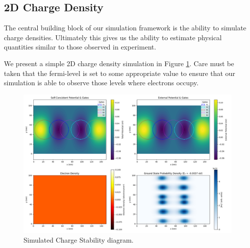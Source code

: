 \documentclass{article}
\begin{document}
\subsection{2D Charge Density}
The central building block of our simulation framework is the ability to simulate charge densities. Ultimately this gives us the ability to estimate physical quantities similar to those observed in experiment.

We present a simple 2D charge density simulation in Figure \ref{fig:charge_density_2D}. Care must be taken that the fermi-level is set to some appropriate value to ensure that our simulation is able to observe those levels where electrons occupy.
\begin{figure}[h!]
	\centering
	\includegraphics[width=\textwidth]{../figures/simulation_results_2d.png}
	\caption{Simulated Charge Stability diagram.}
	\label{fig:charge_density_2D}
\end{figure}
\end{document}
